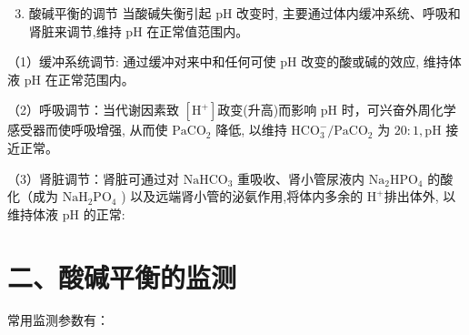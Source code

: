 \documentclass[10pt]{article}
\begin{document}
\begin{enumerate}
  \setcounter{enumi}{2}
  \item 酸碱平衡的调节 当酸碱失衡引起 $\mathrm{pH}$ 改变时, 主要通过体内缓冲系统、呼吸和肾脏来调节,维持 $\mathrm{pH}$ 在正常值范围内。
\end{enumerate}

（1）缓冲系统调节: 通过缓冲对来中和任何可使 $\mathrm{pH}$ 改变的酸或碱的效应, 维持体液 $\mathrm{pH}$ 在正常范围内。

（2）呼吸调节：当代谢因素致 $\left[\mathrm{H}^{+}\right]$政变(升高)而影响 $\mathrm{pH}$ 时，可兴奋外周化学感受器而使呼吸增强, 从而使 $\mathrm{PaCO}_{2}$ 降低, 以维持 $\mathrm{HCO}_{3}^{-} / \mathrm{PaCO}_{2}$ 为 $20: 1, \mathrm{pH}$ 接近正常。

（3）肾脏调节：肾脏可通过对 $\mathrm{NaHCO}_{3}$ 重吸收、肾小管尿液内 $\mathrm{Na}_{2} \mathrm{HPO}_{4}$ 的酸化（成为 $\mathrm{NaH}_{2} \mathrm{PO}_{4}$ ) 以及远端肾小管的泌氨作用,将体内多余的 $\mathrm{H}^{+}$排出体外, 以维持体液 $\mathrm{pH}$ 的正常:

\section*{二、酸碱平衡的监测}
常用监测参数有：
\end{document}
